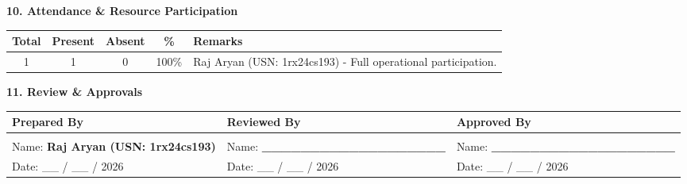 \documentclass[11pt,a4paper]{article}
\newcommand{\sectionheader}[1]{\vspace{10pt}\noindent\Large\textbf{#1}\vspace{4pt}\normalsize}
\newcommand{\tablehead}[1]{\textbf{#1}}
\begin{document}
\vspace{-5pt}

\sectionheader{10. Attendance \& Resource Participation}
\begin{table}[H]
    \renewcommand{\arraystretch}{1.4}
    \centering
    \begin{tabularx}{\textwidth}{|c|c|c|c|X|}
    \hline
    \tablehead{Total} & \tablehead{Present} & \tablehead{Absent} & \tablehead{\%} & \tablehead{Remarks} \\
    \hline
    1 & 1 & 0 & 100\% & Raj Aryan (USN: 1rx24cs193) - Full operational participation. \\
    \hline
    \end{tabularx}
\end{table}

\vspace{-5pt}

\sectionheader{11. Review \& Approvals}
\begin{table}[H]
    \renewcommand{\arraystretch}{2}
    \begin{tabularx}{\textwidth}{|X|X|X|}
    \hline
    \tablehead{Prepared By} & \tablehead{Reviewed By} & \tablehead{Approved By} \\
    \hline
    & & \\
    Name: \textbf{Raj Aryan (USN: 1rx24cs193)} & Name: \textbf{\_\_\_\_\_\_\_\_\_\_\_\_\_\_\_\_\_\_\_} & Name: \textbf{\_\_\_\_\_\_\_\_\_\_\_\_\_\_\_\_\_\_\_} \\
    Date: \_\_ / \_\_ / 2026 & Date: \_\_ / \_\_ / 2026 & Date: \_\_ / \_\_ / 2026 \\
    \hline
    \end{tabularx}
\end{table}
\end{document}
